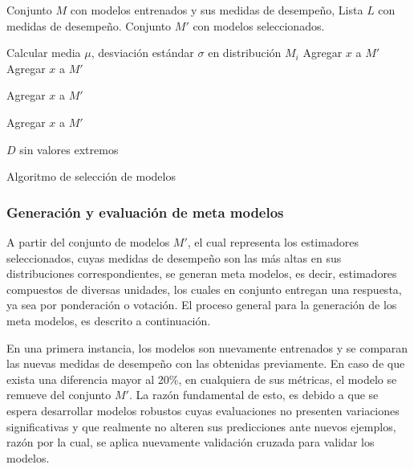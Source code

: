 \begin{algorithm}[H]
	\begin{algorithmic}[1]
		\REQUIRE Conjunto $M$ con modelos entrenados y sus medidas de desempeño, Lista $L$ con medidas de desempeño. \label{lin:lineaRara}
		\ENSURE Conjunto $M'$ con modelos seleccionados.
		
		
		\STATE Calcular  media $\mu$, desviación estándar $\sigma$ en distribución $M_{i}$
		\STATE Agregar $x$ a $M'$
		\ENDIF
		\ENDFOR
		\STATE Agregar $x$ a $M'$
		\ENDIF
		\ENDFOR
		
		\STATE Agregar $x$ a $M'$
		\ENDIF
		\ENDFOR
		
		\STATE Agregar $x$ a $M'$
		\ENDIF
		\ENDFOR
		\ENDIF
		\ENDIF
		\ENDIF
		\ENDFOR
		
		\RETURN $D$ sin valores extremos
	\end{algorithmic}
	\caption{Algoritmo de selección de modelos}\label{alg:select}
\end{algorithm}

\subsubsection{Generación y evaluación de meta modelos}

A partir del conjunto de modelos $M'$, el cual representa los estimadores seleccionados, cuyas medidas de desempeño son las más altas en sus distribuciones correspondientes, se generan meta modelos, es decir, estimadores compuestos de diversas unidades, los cuales en conjunto entregan una respuesta, ya sea por ponderación o votación. El proceso general para la generación de los meta modelos, es descrito a continuación.

En una primera instancia, los modelos son nuevamente entrenados y se comparan las nuevas medidas de desempeño con las obtenidas previamente. En caso de que exista una diferencia mayor al 20\%, en cualquiera de sus métricas, el modelo se remueve del conjunto $M'$. La razón fundamental de esto, es debido a que se espera desarrollar modelos robustos cuyas evaluaciones no presenten variaciones significativas y que realmente no alteren sus predicciones ante nuevos ejemplos, razón por la cual, se aplica nuevamente validación cruzada para validar los modelos.

